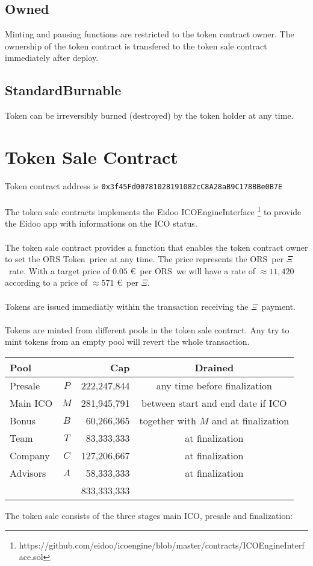 \documentclass{article}
\newcommand{\ether}{$\Xi$}
\newcommand{\ors}{{\sf ORS}}
\newcommand{\orsT}{{\sf ORS Token}}
\begin{document}
\subsection{Owned}
Minting and pausing functions are restricted to the token contract owner. The
ownership of the token contract is transfered to the token sale contract immediately after deploy.
\subsection{StandardBurnable}
Token can be irreversibly burned (destroyed) by the token holder at any time.

\section{Token Sale Contract}
Token contract address is {\tt 0x3f45Fd00781028191082cC8A28aB9C178BBe0B7E}\\\\
The token sale contracts implements the Eidoo 
ICOEngineInterface
\footnote{https://github.com/eidoo/icoengine/blob/master/contracts/ICOEngineInterface.sol} 
 to provide the Eidoo app with informations on the ICO status.\\\\ 
 The token sale contract provides a function that enables the token contract owner to set the \orsT \ price at any time. 
 The price represents the \ors  \ per \ether \ rate. With a target price of
 $0.05$ \euro \ per \ors \ we will have a rate of $\approx 11,420$ according to
 a  price of $\approx 571$ \euro \ per \ether. \\\\ Tokens are issued
 immediatly within the transaction receiving the \ether \ payment.
\\\\
\noindent
Tokens are minted from different pools in the token sale contract. Any try to
mint tokens from an empty pool will revert the whole transaction. 

\begin{center}
\begin{table}[h]
\begin{tabular}{l|c|r|c}


Pool & & Cap & Drained \\\hline
Presale & $P$ &222,247,844& any time before finalization\\
Main ICO & $M$ &281,945,791&between start  and end date if ICO\\
Bonus & $B$ & 60,266,365& together with $M$ and at finalization\\
Team &  $T$ & 83,333,333& at finalization \\
Company &  $C$ & 127,206,667& at finalization\\
Advisors &  $A$ & 58,333,333& at finalization\\\hline
&&833,333,333&\\
\end{tabular}
\end{table}
\end{center}
The token sale consists of the three stages main ICO, presale and finalization:
\end{document}
